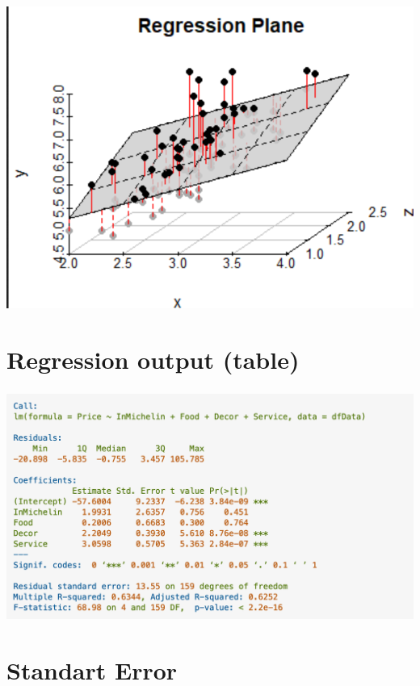 \documentclass[t, 11pt]{beamer}
\begin{document}
\begin{frame} 
	\frametitle{\insertsection} 
	\begin{center}
		\includegraphics[scale=0.4]{reg_res_3d}
	\end{center}
\end{frame}	

\section{Regression output (table)}

	\begin{frame} 
	\frametitle{\insertsection} 
		\begin{center}
		\includegraphics[scale=0.4]{reg_output_r}
	\end{center}
\end{frame}	

\section{Standart Error}
\end{document}
